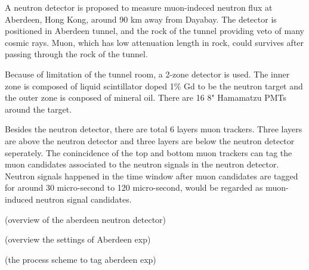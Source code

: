 A neutron detector is proposed to measure muon-indeced neutron flux at Aberdeen, Hong Kong,
around 90 km away from Dayabay. The detector is positioned in Aberdeen tunnel, and the rock of the tunnel
providing veto of many cosmic rays. Muon, which has low attenuation length in rock, could
survives after passing through the rock of the tunnel.

Because of limitation of the tunnel room, a 2-zone detector is used. The inner zone
is composed of liquid scintillator doped 1\% Gd to be the neutron target and 
the outer zone is conposed of mineral oil. There are 16 8" Hamamatzu PMTs around the target.


Besides the neutron detector, there are total 6 layers muon trackers. Three layers
are above the neutron detector and three layers are below the neutron detector seperately.
The conincidence of the top and bottom muon trackers can tag the muon candidates
associated to the neutron signals in the neutron detector. Neutron signals happened
in the time window after muon candidates are tagged for around 30 micro-second to
120 micro-second, would be regarded as muon-induced neutron signal candidates.


(overview of the aberdeen neutron detector)


(overview the settings of Aberdeen exp)

(the process scheme to tag aberdeen exp)
